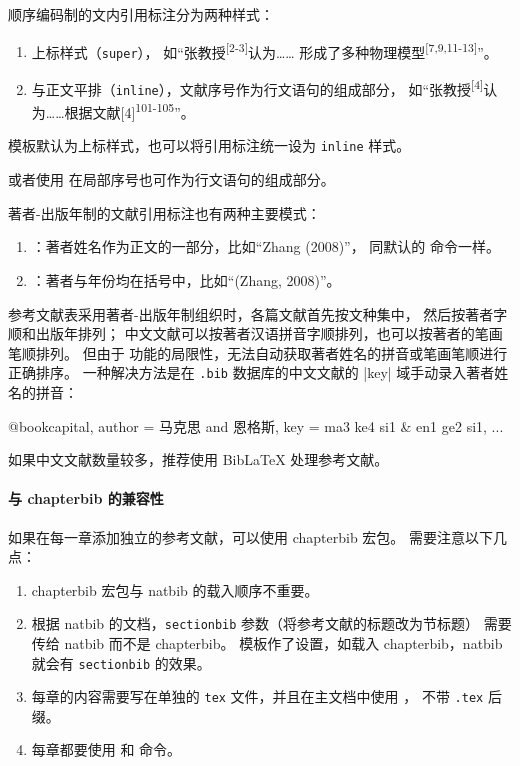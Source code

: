 \documentclass[a4paper]{ltxdoc}
\DeclareRobustCommand\file{\nolinkurl}
\DeclareRobustCommand\pkg{\textsf}
\DeclareRobustCommand\opt{\texttt}
\begin{document}
顺序编码制的文内引用标注分为两种样式：
\begin{enumerate}
  \item 上标样式（\opt{super}）， 如“张教授\textsuperscript{[2-3]}认为……
    形成了多种物理模型\textsuperscript{[7,9,11-13]}”。
  \item 与正文平排（\opt{inline}），文献序号作为行文语句的组成部分，
    如“张教授\textsuperscript{[4]}认为……根据文献[4]\textsuperscript{101-105}”。
\end{enumerate}

模板默认为上标样式，也可以将引用标注统一设为 \opt{inline} 样式。
\begin{latex}
\end{latex}
或者使用  在局部序号也可作为行文语句的组成部分。

著者-出版年制的文献引用标注也有两种主要模式：
\begin{enumerate}
  \item {}：著者姓名作为正文的一部分，比如“Zhang (2008)”，
    同默认的  命令一样。
  \item {}：著者与年份均在括号中，比如“(Zhang, 2008)”。
\end{enumerate}

参考文献表采用著者-出版年制组织时，各篇文献首先按文种集中， 然后按著者字顺和出版年排列；
中文文献可以按著者汉语拼音字顺排列，也可以按著者的笔画笔顺排列。
但由于 \BibTeX{} 功能的局限性，无法自动获取著者姓名的拼音或笔画笔顺进行正确排序。
一种解决方法是在 \file{.bib} 数据库的中文文献的 |key| 域手动录入著者姓名的拼音：
\begin{latex}
  @book{capital,
    author = {马克思 and 恩格斯},
    key    = {ma3 ke4 si1 & en1 ge2 si1},
    ...
  }
\end{latex}
如果中文文献数量较多，推荐使用 BibLaTeX 处理参考文献。

\paragraph{与 \pkg{chapterbib} 的兼容性}
如果在每一章添加独立的参考文献，可以使用 \pkg{chapterbib} 宏包。
需要注意以下几点：
\begin{enumerate}
  \item \pkg{chapterbib} 宏包与 \pkg{natbib} 的载入顺序不重要。
  \item 根据 \pkg{natbib} 的文档，\opt{sectionbib} 参数（将参考文献的标题改为节标题）
    需要传给 \pkg{natbib} 而不是 \pkg{chapterbib}。
    模板作了设置，如载入 \pkg{chapterbib}，\pkg{natbib} 就会有 \opt{sectionbib} 的效果。
  \item 每章的内容需要写在单独的 \file{tex} 文件，并且在主文档中使用 ，
    不带 \file{.tex} 后缀。
  \item 每章都要使用  和  命令。
\end{enumerate}
\end{document}
